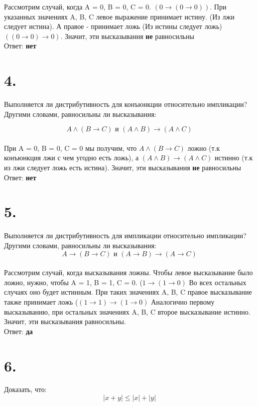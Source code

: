 \documentclass[a4paper,12pt]{article}
\begin{document}
Рассмотрим случай, когда A = 0, B = 0, C = 0. $(0 \rightarrow (0 \rightarrow 0))$. При указанных значениях  A, B, C левое выражение принимает истину. (Из лжи следует истина). А правое - принимает ложь (Из истины следует ложь) $ ((0\rightarrow 0) \rightarrow 0) $. Значит, эти высказывания \textbf{не} равносильны \\

Ответ: \textbf{нет}
\section*{4.}
Выполняется ли дистрибутивность для конъюнкции относительно импликации? Другими словами, равносильны ли высказывания:

\[A \wedge (B \rightarrow C) \text{ и }(A \wedge B) \rightarrow (A \wedge C) \]\\

При A = 0, B = 0, C = 0 мы получим, что $ A \wedge (B \rightarrow C)$ ложно (т.к конъюнкция лжи с чем угодно есть ложь), а $(A \wedge B) \rightarrow (A \wedge C) $ истинно (т.к из лжи следует ложь есть истина). Значит, эти высказывания \textbf{не} равносильны\\

Ответ: \textbf{нет}
\section*{5.}
Выполняется ли дистрибутивность для импликации относительно импликации? Другими словами, равносильны ли высказывания:
\[A \rightarrow (B \rightarrow C) \text{ и } (A \rightarrow B) \rightarrow (A \rightarrow C)\]\\

Рассмотрим случай, когда высказывания ложны. Чтобы левое высказывание было ложно, нужно, чтобы A = 1, B = 1, C = 0. ($ 1 \rightarrow(1 \rightarrow 0)$ Во всех остальных случаях оно будет истинным. При таких значениях A, B, C правое высказывание также принимает ложь ($ (1  \rightarrow 1) \rightarrow (1 \rightarrow 0)$ Аналогично первому высказыванию, при остальных значениях A, B, C  второе высказывание истинно. Значит, эти высказывания равносильны.\\

Ответ: \textbf{да}
\section*{6.}
Доказать, что:
\[
|x+y| \leq |x| + |y|
\]\\
\end{document}
